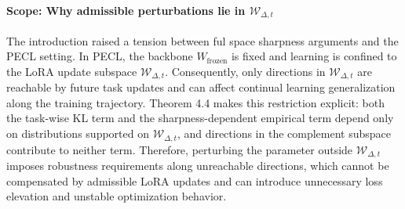 \documentclass{article}
\theoremstyle{plain}
\theoremstyle{definition}
\theoremstyle{remark}
\begin{document}
\paragraph{Scope: Why admissible perturbations lie in $\mathcal W_{\Delta,t}$}
The introduction raised a tension between ful space sharpness arguments and the PECL setting.
In PECL, the backbone $W_{\mathrm{frozen}}$ is fixed and learning is confined to the LoRA update subspace $\mathcal W_{\Delta,t}$. Consequently, only directions in $\mathcal W_{\Delta,t}$ are reachable by future task updates and can affect continual learning generalization along the training trajectory.
Theorem 4.4 makes this restriction explicit: both the task-wise KL term and the sharpness-dependent empirical term depend only on distributions supported on $\mathcal W_{\Delta,t}$, and directions in the complement subspace contribute to neither term.
Therefore, perturbing the parameter outside $\mathcal W_{\Delta,t}$ imposes robustness requirements along unreachable directions, which cannot be compensated by admissible LoRA updates and can introduce unnecessary loss elevation and unstable optimization behavior.





\end{document}
